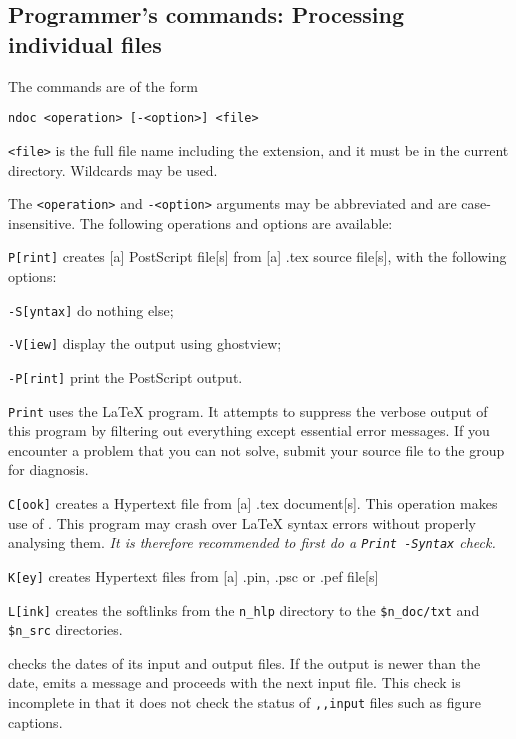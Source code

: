 \subsection{ Programmer's commands: Processing individual files } 

        The commands are of the form 

        \verb/ndoc <operation> [-<option>] <file>/ 

        \verb/<file>/ is the full file name including the extension, and it
must be in the current directory. Wildcards may be used. 

        The \verb/<operation>/ and \verb/-<option>/ arguments may be
abbreviated and are case-insensitive. The following operations and options are
available: 

\bi 
\item   \verb/P[rint]/ creates [a] PostScript file[s] from [a] .tex source
file[s], with the following options: 
  \bi 
  \item[] \verb/-S[yntax]/ do nothing else; 
  \item[] \verb/-V[iew]/ display the output using ghostview; 
  \item[] \verb/-P[rint]/ print the PostScript output. 
  \ei 

\verb/Print/ uses the LaTeX program. It attempts to suppress the verbose output
of this program by filtering out everything except essential error messages. If
you encounter a problem that you can not solve, submit your source file to the 
\NEWSTAR group for diagnosis. 

\item   \verb/C[ook]/ creates a Hypertext file from [a] .tex document[s]. This
operation makes use of \ltoh. This program may crash over LaTeX syntax errors
without properly analysing them. {\em It is therefore recommended to first do a 
\verb/Print -Syntax/ check.} 

\item   \verb/K[ey]/ creates Hypertext files from [a] .pin, .psc or .pef
file[s] 

\item   \verb/L[ink]/ creates the softlinks from the \verb/n_hlp/ directory to
the \verb:$n_doc/txt: and \verb:$n_src: directories. 
\ei 

        \ndoc checks the dates of its input and output files. If the output is
newer than the date, \ndoc emits a message and proceeds with the next input
file. This check is incomplete in that it does not check the status of 
\verb/,,input/ files such as figure captions. 

